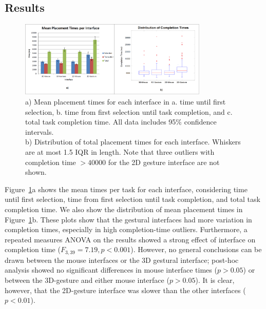 \documentclass[pageno]{jpaper}
\begin{document}
\subsection{Results}
\begin{figure}
\centering
\includegraphics[width=0.8\textwidth]{figures/aggmean.png}
\caption{a) Mean placement times for each interface in a. time until first
selection, b. time from first selection until task completion, and c. total task
completion time. All data includes 95\% confidence intervals. \\
b) Distribution of total placement times for each interface. Whiskers are
at most 1.5 IQR in length. Note that three outliers with completion time $> 40000$
for the 2D gesture interface are not shown.}
\label{fig:aggregate}
\end{figure}
Figure~\ref{fig:aggregate}a shows the mean times per task for each interface, considering time until first selection, time from first selection until
task completion, and total task completion time. We also show the distribution
of mean placement times in Figure~\ref{fig:aggregate}b. These plots show that the gestural interfaces had more variation in completion times, especially in high completion-time
outliers. Furthermore, a repeated measures ANOVA on the results showed a strong effect of
interface on completion time ($F_{3,39}=7.19, p < 0.001$).
However, no general conclusions can be drawn between the mouse interfaces or the 3D gestural interface; post-hoc analysis showed no significant differences
in mouse interface times ($p > 0.05$) or between the 3D-gesture and either mouse interface ($p > 0.05$). It is clear, however, that the 2D-gesture interface
was slower than the other interfaces ($p < 0.01$).
\end{document}

